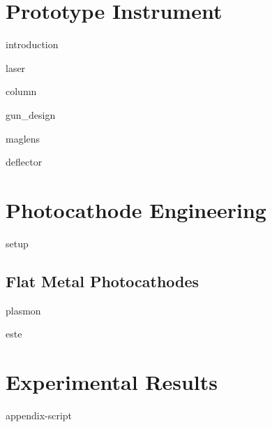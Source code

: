 \documentclass{uicthesi}
\begin{document}
\chapter{Prototype Instrument}

  {introduction}

  {laser}

  {column}

  {gun_design}

  {maglens}

  {deflector}

\chapter{Photocathode Engineering}

  {setup}

\section{Flat Metal Photocathodes}

  {plasmon}

  {este}

\chapter{Experimental Results}

\appendix
  {appendix-script}

\newpage


\end{document}
